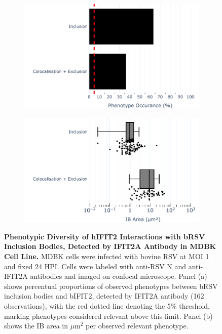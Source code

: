 \begin{figure}
    \begin{subfigure}{0.495\textwidth}
        \caption{}
        \includegraphics[width=1\linewidth]{08. Chapter 3/Figs/02. Infection/02. IFIT2/01. IFIT2A/13. bar_i2a_mdbk.pdf} 
    \end{subfigure}
    \begin{subfigure}{0.495\textwidth}
        \caption{}
        \includegraphics[width=1\linewidth]{08. Chapter 3/Figs/02. Infection/02. IFIT2/01. IFIT2A/14. box_i2a_mdbk.pdf}
    \end{subfigure}
    \caption[Phenotypic Diversity of hIFIT2 Interactions with bRSV Inclusion Bodies, Detected by IFIT2A Antibody in MDBK Cell Line.]{\textbf{Phenotypic Diversity of hIFIT2 Interactions with bRSV Inclusion Bodies, Detected by IFIT2A Antibody in MDBK Cell Line.} MDBK cells were infected with bovine RSV at MOI 1 and fixed 24 HPI. Cells were labeled with anti-RSV N and anti-IFIT2A antibodies and imaged on confocal microscope. Panel (a) shows percentual proportions of observed phenotypes between bRSV inclusion bodies and bIFIT2, detected by IFIT2A antibody (162 observations), with the red dotted line denoting the 5\% threshold, marking phenotypes considered relevant above this limit. Panel (b) shows the IB area in \(\mu \mbox{m}^2\) per observed relevant phenotype.}
    \label{fig:Phenotypic Diversity of hIFIT2 Interactions with bRSV Inclusion Bodies, Detected by IFIT2A Antibody in MDBK Cell Line}
\end{figure}

